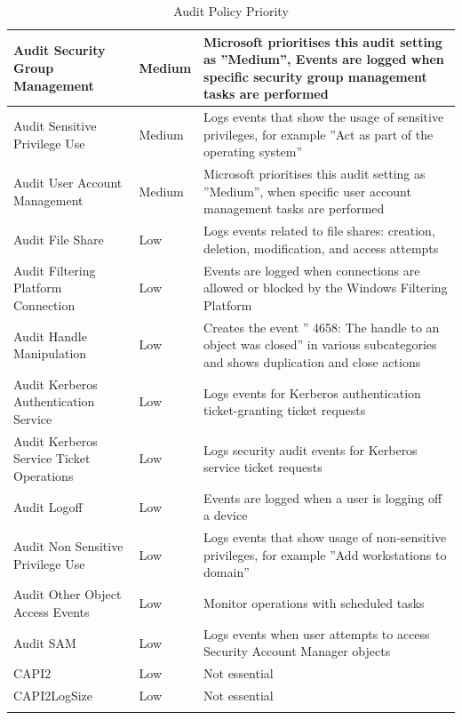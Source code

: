 \begin{longtable}{| p{5cm} | p{1.5cm} | p{9.5cm} |}
        Audit Security Group Management & Medium & Microsoft prioritises  this audit setting as ''Medium'', Events are logged when specific security group management tasks are performed \\ \hline
        Audit Sensitive Privilege Use & Medium & Logs events that show the usage of sensitive privileges, for example ''Act as part of the operating system'' \\ \hline
        Audit User Account Management & Medium & Microsoft prioritises this audit setting as ''Medium'', when specific user account management tasks are performed \\ \hline
        Audit File Share & Low & Logs events related to file shares: creation, deletion, modification, and access attempts \\ \hline
        Audit Filtering Platform Connection & Low & Events are logged when connections are allowed or blocked by the Windows Filtering Platform \\ \hline
        Audit Handle Manipulation & Low & Creates the event '' 4658: The handle to an object was closed'' in various subcategories and shows duplication and close actions\\ \hline
        Audit Kerberos Authentication Service & Low & Logs events for Kerberos authentication ticket-granting ticket requests \\ \hline
        Audit Kerberos Service Ticket Operations & Low &Logs security audit events for Kerberos service ticket requests \\ \hline
        Audit Logoff & Low & Events are logged when a user is logging off a device\\ \hline
        Audit Non Sensitive Privilege Use & Low & Logs events that show usage of non-sensitive privileges, for example ''Add workstations to domain'' \\ \hline
        Audit Other Object Access Events & Low & Monitor operations with scheduled tasks \\ \hline
        Audit SAM & Low & Logs events when user attempts to access Security Account Manager objects \\ \hline
        CAPI2 & Low & Not essential \\ \hline
        CAPI2LogSize & Low & Not essential \\ \hline
    \caption{Audit Policy Priority \cite{SecAuditFAQ}} 
\end{longtable}

\clearpage

